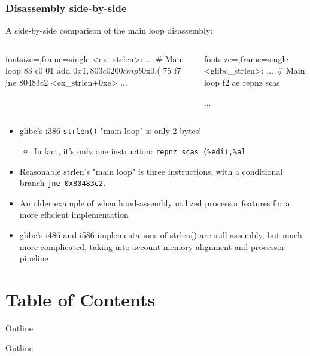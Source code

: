 \documentclass[11pt,xcolor=dvipsnames]{beamer}
\newcommand{\vs}{\vspace{0.5em}}
\newcommand{\mvs}{\vspace{-0.95em}}
\begin{document}
\begin{frame}[fragile,t]
\frametitle{Disassembly side-by-side}
\mvs
A side-by-side comparison of the main loop disassembly:\vspace{-0.8em}
\begin{columns}[T]
\begin{customobjdumpcode*}{fontsize=\fontsize{6.5}{8},frame=single}
<ex_strlen>:
...
# Main loop
83 c0 01        add    $0x1,%
80 3c 02 00     cmpb   $0x0,(%
75 f7           jne    80483c2 <ex_strlen+0xe>
...
\end{customobjdumpcode*}
\begin{customobjdumpcode*}{fontsize=\fontsize{6.5}{8},frame=single}
<glibc_strlen>:
...
# Main loop
f2 ae           repnz scas %


...
\end{customobjdumpcode*}
\end{columns}
\vs
\begin{itemize}
        \item glibc's i386 \verb+strlen()+ "main loop" is only 2 bytes!
        \begin{itemize}
                \item In fact, it's only one instruction: \verb+repnz scas (%edi),%al+.
        \end{itemize}
        \pause
        \item Reasonable strlen's "main loop" is three instructions, with a conditional branch \verb+jne 0x80483c2+.
        \pause
        \item An older example of when hand-assembly utilized processor features for a more efficient implementation
        \item glibc's i486 and i586 implementations of {\ttfamily strlen()} are still assembly, but much more complicated, taking into account memory alignment and processor pipeline
\end{itemize}
\end{frame}

\section*{Table of Contents}
\begin{frame}{Outline}
\tableofcontents[part=1]
\end{frame}

\begin{frame}{Outline}
\tableofcontents[part=2]
\end{frame}
\end{document}
